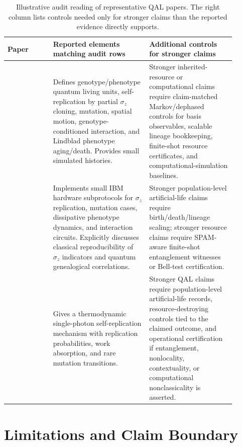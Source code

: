 \documentclass[11pt]{article}
\newcommand{\sz}{\sigma_z}
\begin{document}
\begin{table}[!htbp]
\centering
\scriptsize
\setlength{\tabcolsep}{3.5pt}
\begin{tabular}{P{0.18\linewidth}P{0.38\linewidth}P{0.34\linewidth}}
\toprule
\textbf{Paper} & \textbf{Reported elements matching audit rows} & \textbf{Additional controls for stronger claims} \\
\midrule
\citet{alvarez2016artificial} & Defines genotype/phenotype quantum living units, self-replication by partial $\sz$ cloning, mutation, spatial motion, genotype-conditioned interaction, and Lindblad phenotype aging/death. Provides small simulated histories. & Stronger inherited-resource or computational claims require claim-matched Markov/dephased controls for basis observables, scalable lineage bookkeeping, finite-shot resource certificates, and computational-simulation baselines. \\
\addlinespace
\citet{alvarez2018ibm} & Implements small IBM hardware subprotocols for $\sz$ replication, mutation cases, dissipative phenotype dynamics, and interaction circuits. Explicitly discusses classical reproducibility of $\sz$ indicators and quantum genealogical correlations. & Stronger population-level artificial-life claims require birth/death/lineage scaling; stronger resource claims require SPAM-aware finite-shot entanglement witnesses or Bell-test certification. \\
\addlinespace
\citet{valente2021self} & Gives a thermodynamic single-photon self-replication mechanism with replication probabilities, work absorption, and rare mutation transitions. & Stronger QAL claims require population-level artificial-life records, resource-destroying controls tied to the claimed outcome, and operational certification if entanglement, nonlocality, contextuality, or computational nonclassicality is asserted. \\
\bottomrule
\end{tabular}
\caption{Illustrative audit reading of representative QAL papers. The right column lists controls needed only for stronger claims than the reported evidence directly supports.}
\label{tab:coverage}
\end{table}

\FloatBarrier

\section{Limitations and Claim Boundary}
\end{document}
